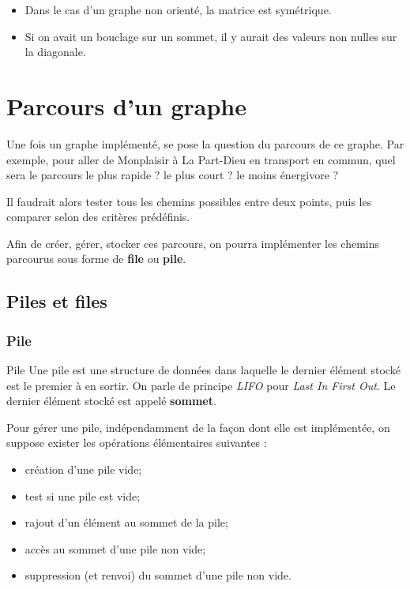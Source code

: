 \begin{rem}
\begin{itemize}
\item Dans le cas d'un graphe non orienté, la matrice est symétrique. 
\item Si on avait un bouclage sur un sommet, il y aurait des valeurs non nulles sur la diagonale. 
\end{itemize}
\end{rem}

\section{Parcours d'un graphe}

Une fois un graphe implémenté, se pose la question du parcours de ce graphe. Par exemple, pour aller de Monplaisir à La Part-Dieu en transport en commun, quel sera le parcours le plus rapide ? le plus court ? le moins énergivore ?

Il faudrait alors tester tous les chemins possibles entre deux points, puis les comparer selon des critères prédéfinis. 

Afin de créer, gérer, stocker ces parcours, on pourra implémenter les chemins parcourus sous forme de \textbf{file} ou \textbf{pile}.

\subsection{Piles et files}

\subsubsection{Pile}
\begin{defi}{Pile}
Une pile est une structure de données dans laquelle le dernier élément stocké est le premier à en sortir. On parle de principe \textit{LIFO} pour \textit{Last In First Out}. Le dernier élément stocké est appelé \textbf{sommet}.
\end{defi}

Pour gérer une pile, indépendamment de la façon dont elle est implémentée, on suppose exister les opérations élémentaires suivantes : 
\begin{itemize}
\item création d'une pile vide;
\item test si une pile est vide;
\item rajout d'un élément au sommet de la pile;
\item accès au sommet d'une pile non vide;
\item suppression (et renvoi) du sommet d'une pile non vide.
\end{itemize}

